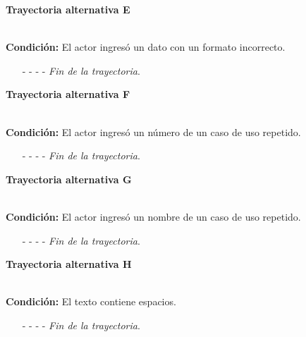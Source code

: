 \hypertarget{CU12-1:TAE}{\textbf{Trayectoria alternativa E}}\\
\noindent \textbf{Condición:} El actor ingresó un dato con un formato incorrecto.
\begin{enumerate}
	\UCpaso[\UCsist] Muestra el mensaje  señalando el campo que presenta el error en la pantalla .
	\UCpaso Regresa al paso \ref{CU12.1-P12} de la trayectoria principal.
	\item[- -] - - {\em {Fin de la trayectoria}}.
\end{enumerate}
\hypertarget{CU12-1:TAF}{\textbf{Trayectoria alternativa F}}\\
\noindent \textbf{Condición:} El actor ingresó un número de un caso de uso repetido.
\begin{enumerate}
	\UCpaso[\UCsist] Muestra el mensaje  señalando el campo que presenta la duplicidad en la pantalla .
	\UCpaso Regresa al paso \ref{CU12.1-P12} de la trayectoria principal.
	\item[- -] - - {\em {Fin de la trayectoria}}.
\end{enumerate}
\hypertarget{CU12-1:TAG}{\textbf{Trayectoria alternativa G}}\\
\noindent \textbf{Condición:} El actor ingresó un nombre de un caso de uso repetido.
\begin{enumerate}
	\UCpaso[\UCsist] Muestra el mensaje  señalando el campo que presenta la duplicidad en la pantalla .
	\UCpaso Regresa al paso \ref{CU12.1-P12} de la trayectoria principal.
	\item[- -] - - {\em {Fin de la trayectoria}}.
\end{enumerate}
\hypertarget{CU12-1:TAH}{\textbf{Trayectoria alternativa H}}\\
\noindent \textbf{Condición:} El texto contiene espacios.
\begin{enumerate}
	\UCpaso[\UCsist] Sustituye los espacios por guiones bajos.
	\UCpaso Continua en el \ref{CU12.1-TA1} de la trayectoria alternativa A.
	\item[- -] - - {\em {Fin de la trayectoria}}.
\end{enumerate}

